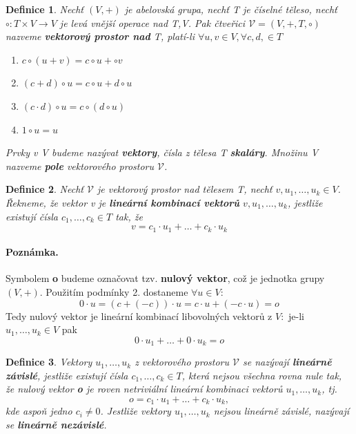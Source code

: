 \documentclass[12pt,a4paper]{article}
\newtheorem{definition}{Definice}
\begin{document}
\begin{definition}
	Nechť $(V, +)$ je abelovská grupa, nechť T je číselné těleso, nechť $\circ : T \times V \rightarrow V$ je levá vnější operace nad T,V. Pak čtveřici $\mathscr{V} = (V, +, T, \circ)$ nazveme \textbf{vektorový prostor nad} T, platí-li $\forall u,v \in V, \forall c,d, \in T$
	\begin{enumerate}
		\item $c \circ (u + v) = c \circ u + \circ v$
		\item $(c + d) \circ u = c \circ u + d \circ u$
		\item $(c \cdot d) \circ u = c \circ (d \circ u)$
		\item $1 \circ u = u$
	\end{enumerate}
	Prvky v V budeme nazývat \textbf{vektory}, čísla z tělesa T \textbf{skaláry}. Množinu V nazveme \textbf{pole} vektorového prostoru $\mathscr{V}$.
\end{definition}

\begin{definition}
	Nechť  $\mathscr{V}$ je vektorový prostor nad tělesem T, nechť $v,u_1,\dots,u_k \in V$. Řekneme, že vektor v je \textbf{lineární kombinací vektorů}  $v,u_1,\dots,u_k$, jestliže existují čísla $c_1, \dots, c_k \in T$ tak, že $$v = c_1 \cdot u_1 + \dots + c_k \cdot u_k$$
\end{definition}
\paragraph{Poznámka.} Symbolem \textbf{o} budeme označovat tzv. \textbf{nulový vektor}, což je jednotka grupy $(V, +)$. Použitím podmínky 2. dostaneme $\forall u \in V:$ $$0 \cdot u = (c + (-c)) \cdot u = c \cdot u + (-c \cdot u) = o$$
Tedy nulový vektor je lineární kombinací libovolných vektorů z $V: $ je-li $u_1,\dots,u_k \in V$ pak $$0 \cdot u_1 + \dots + 0 \cdot u_k = o$$


\begin{definition}
	Vektory $u_1, \dots, u_k$ z vektorového prostoru $\mathscr{V}$ se nazývají \textbf{lineárně závislé}, jestliže existují čísla $c_1, \dots, c_k \in T$, která nejsou všechna rovna nule tak, že nulový vektor \textbf{o} je roven netriviální lineární kombinaci vektorů $u_1, \dots, u_k$, tj. $$o = c_1 \cdot u_1 + \dots + c_k \cdot u_k,$$
	kde aspoň jedno $c_i \not= 0$. Jestliže vektory $u_1, \dots, u_k$ nejsou lineárně závislé, nazývají se \textbf{lineárně nezávislé}.
\end{definition}
\end{document}
